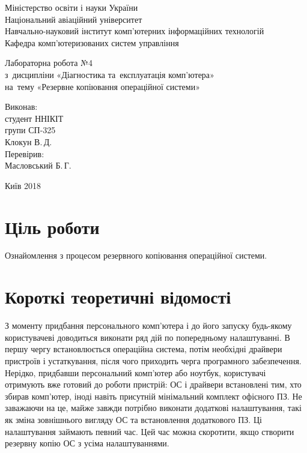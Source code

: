 \documentclass[
	a4paper,
	oneside,
	DIV = 12,
	fontsize = 13pt,
	headings = normal,
]{scrartcl}
\newlength{\gridunitwidth}
\newcommand{\allcaps}[1]{{\addfontfeatures{LetterSpace = 5}#1}}
\begin{document}
\setlength{\gridunitwidth}{\textwidth / 12}
	\begin{titlepage}
		\begin{center}
			Міністерство освіти і науки України\\
			Національний авіаційний університет\\
			Навчально-науковий інститут комп'ютерних інформаційних технологій\\
			Кафедра комп'ютеризованих систем управління

			\vspace{\fill}
				Лабораторна робота №4\\
				з~дисципліни «Діагностика та~експлуатація комп'ютера»\\
				на~тему «Резервне копіювання операційної системи»\\

			\vspace{\fill}

			\begin{flushright}
				Виконав:\\
				студент \allcaps{ННІКІТ}\\
				групи СП-325\\
				Клокун В.\,Д.\\
				Перевірив:\\
				Масловський Б.\,Г.
			\end{flushright}

			Київ 2018
		\end{center}
	\end{titlepage}

	\section{Ціль роботи}
		Ознайомлення з процесом резервного копіювання операційної системи.

	\section{Короткі теоретичні відомості}
		З моменту придбання персонального комп'ютера і до його запуску будь-якому користувачеві доводиться виконати ряд дій по попередньому налаштуванні. В першу чергу встановлюється операційна система, потім необхідні драйвери пристроїв і устаткування, після чого приходить черга програмного забезпечення. Нерідко, придбавши персональний комп'ютер або ноутбук, користувачі отримують вже готовий до роботи пристрій: ОС і драйвери встановлені тим, хто збирав комп'ютер, іноді навіть присутній мінімальний комплект офісного ПЗ. Не заважаючи на це, майже завжди потрібно виконати додаткові налаштування, такі як зміна зовнішнього вигляду ОС та встановлення додаткового ПЗ. Ці налаштування займають певний час. Цей час можна скоротити, якщо створити резервну копію ОС з усіма налаштуваннями.
\end{document}
